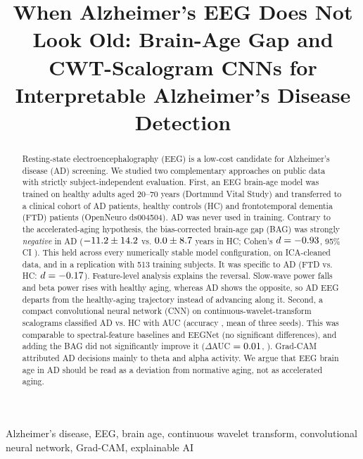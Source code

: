 \documentclass[conference]{IEEEtran}
\begin{document}
\title{When Alzheimer's EEG Does Not Look Old: Brain-Age Gap and CWT-Scalogram CNNs for Interpretable Alzheimer's Disease Detection}

\author{
}

\maketitle

\begin{abstract}
Resting-state electroencephalography (EEG) is a low-cost candidate for Alzheimer's disease (AD) screening. We studied two complementary approaches on public data with strictly subject-independent evaluation. First, an EEG brain-age model was trained on \dmN{} healthy adults aged 20--70 years (Dortmund Vital Study) and transferred to a clinical cohort of \nAD{} AD patients, \nHC{} healthy controls (HC) and \nFTD{} frontotemporal dementia (FTD) patients (OpenNeuro ds004504). AD was never used in training. Contrary to the accelerated-aging hypothesis, the bias-corrected brain-age gap (BAG) was strongly \emph{negative} in AD ($-11.2{}\pm14.2{}$ vs. $0.0{}\pm8.7{}$ years in HC; Cohen's $d=-0.93{}$, 95\% CI \bagDci{}). This held across every numerically stable model configuration, on ICA-cleaned data, and in a replication with 513 training subjects. It was specific to AD (FTD vs. HC: $d=-0.17{}$). Feature-level analysis explains the reversal. Slow-wave power falls and beta power rises with healthy aging, whereas AD shows the opposite, so AD EEG departs from the healthy-aging trajectory instead of advancing along it. Second, a compact convolutional neural network (CNN) on continuous-wavelet-transform scalograms classified AD vs. HC with AUC \cnnAUC{} (accuracy \cnnAcc{}, mean of three seeds). This was comparable to spectral-feature baselines and EEGNet (no significant differences), and adding the BAG did not significantly improve it ($\Delta$AUC $=0.01{}$, \combP{}). Grad-CAM attributed AD decisions mainly to theta and alpha activity. We argue that EEG brain age in AD should be read as a deviation from normative aging, not as accelerated aging.
\end{abstract}

\begin{IEEEkeywords}
Alzheimer's disease, EEG, brain age, continuous wavelet transform, convolutional neural network, Grad-CAM, explainable AI
\end{IEEEkeywords}
\end{document}
